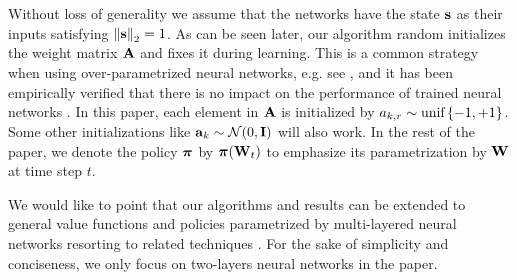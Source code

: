 
Without loss of generality we assume that the networks have the state ${\mathbf{s}}$ as their inputs satisfying $\left\| {\mathbf{s}} \right\|_2 = 1$.
As can be seen later, our algorithm random initializes the weight matrix ${\mathbf{A}}$ and fixes it during learning. 
This is a common strategy when using over-parametrized neural networks, e.g. see \citep{li2018learning,du2018gradientA,du2018gradientB,allen2018convergenceA,allen2018convergenceB}, and it has been empirically verified that there is no impact on the performance of trained neural networks \citep{hoffer2018fix}.
In this paper, each element in ${\mathbf{A}}$ is initialized by $a_{k,r} \sim {\text{unif}}\left\{-1, +1\right\}$. Some other initializations like ${\mathbf{a}}_k \sim {\mathcal{N}}(0, {\mathbf{I}})$ will also work. In the rest of the paper, we denote the policy ${\boldsymbol{\pi}}$ by ${\boldsymbol{\pi}}({\mathbf{W}}_t)$ to emphasize its parametrization by ${\mathbf{W}}$ at time step $t$. 

We would like to point that our algorithms and results can be extended to general value functions and policies parametrized by multi-layered neural networks resorting to related techniques \citep{allen2018convergenceA,allen2018convergenceB,du2018gradientA}. For the sake of simplicity and conciseness, we only focus on two-layers neural networks in the paper.


